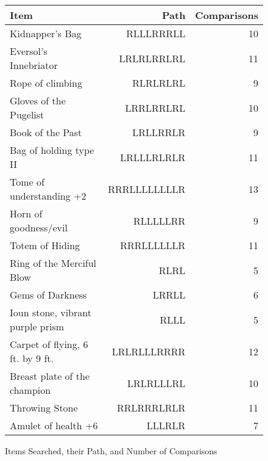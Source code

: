 \documentclass[letterpaper, 10pt,DIV=13]{scrartcl}
\numberwithin{equation}{section} %
\numberwithin{figure}{section} %
\numberwithin{table}{section} %
\begin{document}
\begin{figure} [h]
    \centering 
    \renewcommand{\arraystretch}{1}
    \begin{tabular}{||lrr||} 
     \hline
    
    Item & Path & Comparisons \\
     \hline
    Kidnapper's Bag & RLLLRRRLL & 10\\
    Eversol's Innebriator & LRLRLRRLRL & 11\\
    Rope of climbing & RLRLRLRL & 9\\
    Gloves of the Pugelist & LRRLRRLRL & 10\\
    Book of the Past & LRLLRRLR & 9\\
    Bag of holding type II & LRLLLRLRLR & 11\\
    Tome of understanding +2 & RRRLLLLLLLLR & 13\\
    Horn of goodness/evil & RLLLLLRR & 9\\
    Totem of Hiding & RRRLLLLLLR & 11\\
    Ring of the Merciful Blow & RLRL & 5\\
    Gems of Darkness & LRRLL & 6\\
    Ioun stone, vibrant purple prism & RLLL & 5\\
    Carpet of flying, 6 ft. by 9 ft. & LRLRLLLRRRR & 12\\
    Breast plate of the champion & LRLRLLLRL & 10\\
    Throwing Stone & RRLRRRLRLR & 11\\
    Amulet of health +6 & LLLRLR & 7\\
     \hline

    \end{tabular}
    \caption{Items Searched, their Path, and Number of Comparisons}
    \label{figure:SearchResults}
\end{figure}
\end{document}
